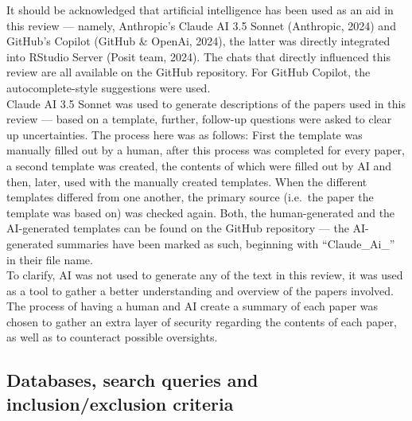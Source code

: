 \documentclass[
  stu,floatsintext]{apa7}
\begin{document}
It should be acknowledged that artificial intelligence has been used as an aid in this review --- namely, Anthropic's Claude AI 3.5 Sonnet (Anthropic, 2024) and GitHub's Copilot (GitHub \& OpenAi, 2024), the latter was directly integrated into RStudio Server (Posit team, 2024). The chats that directly influenced this review are all available on the GitHub repository.
For GitHub Copilot, the autocomplete-style suggestions were used.\\
Claude AI 3.5 Sonnet was used to generate descriptions of the papers used in this review --- based on a template, further, follow-up questions were asked to clear up uncertainties.
The process here was as follows: First the template was manually filled out by a human, after this process was completed for every paper, a second template was created, the contents of which were filled out by AI and then, later, used with the manually created templates. When the different templates differed from one another, the primary source (i.e.~the paper the template was based on) was checked again. Both, the human-generated and the AI-generated templates can be found on the GitHub repository --- the AI-generated summaries have been marked as such, beginning with ``Claude\_Ai\_'' in their file name.\\
To clarify, AI was not used to generate any of the text in this review, it was used as a tool to gather a better understanding and overview of the papers involved. The process of having a human and AI create a summary of each paper was chosen to gather an extra layer of security regarding the contents of each paper, as well as to counteract possible oversights.

\subsection{Databases, search queries and inclusion/exclusion criteria}\label{databases-search-queries-and-inclusionexclusion-criteria}
\end{document}
